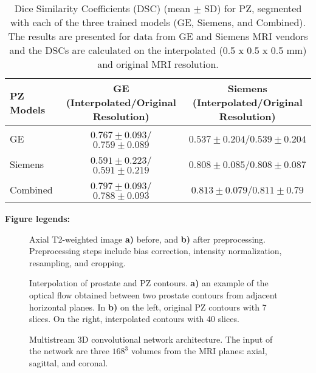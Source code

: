 \newpage
\begin{table}[ht]
     \caption{Dice Similarity Coefficients (DSC) (mean $\pm$ SD) for PZ, segmented with each of the three trained models (GE, Siemens, and Combined). The results are presented for data from GE and Siemens MRI vendors and the DSCs are calculated on the interpolated (0.5 x 0.5 x 0.5 mm) and original MRI resolution.}
    \begin{tabular}{lcc}
         \hline
            \textbf{PZ Models} & \textbf{GE (Interpolated/Original Resolution)} & \textbf{Siemens (Interpolated/Original Resolution)}\\
         \hline
         GE  & $0.767\pm0.093$/$0.759\pm0.089$ & $0.537\pm0.204$/$0.539\pm0.204$ \\
         \hline
         Siemens  & $0.591\pm0.223$/$0.591\pm0.219$ & $0.808\pm0.085$/$0.808\pm0.087$ \\
         \hline
         Combined & $\mathbf{0.797\pm0.093}$/$0.788\pm0.093$ & $\mathbf{0.813\pm0.079}$/$0.811\pm0.79$\\
         \hline
    \end{tabular}
    \label{tab:res_pz}
\end{table}

\newpage
\textbf{Figure legends:}
\begin{figure}[ht]
    \centering
    \caption{Axial T2-weighted image \textbf{a)} before, and \textbf{b)} after preprocessing. Preprocessing steps include bias correction, intensity normalization, resampling, and cropping.} 
    \label{fig_1}
\end{figure}

\begin{figure}[ht]
    \centering
    \caption{Interpolation of prostate and PZ contours. \textbf{a)} an example of the optical flow obtained between two prostate contours from adjacent horizontal planes. In \textbf{b)} on the left, original PZ contours with 7 slices. On the right, interpolated contours with 40 slices.}
    \label{fig:fig_2}
\end{figure}

\begin{figure*}[ht]
    \centering
    \caption{Multistream 3D convolutional network architecture. The input of the network are three $168^3$ volumes from the MRI planes: axial, sagittal, and coronal. }
    \label{fig:fig_3}
\end{figure*}

